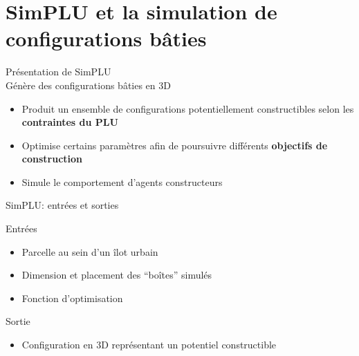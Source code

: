 \documentclass[xcolor=table]{beamer}
\begin{document}
\section[SimPLU]{SimPLU et la simulation de configurations bâties}




\begin{frame}{Présentation de SimPLU}
	\\
	Génère des configurations bâties en 3D
	\begin{itemize}
		\item Produit un ensemble de configurations potentiellement constructibles selon les \textbf{contraintes du PLU}
		\item Optimise certains paramètres afin de poursuivre différents \textbf{objectifs de construction}
		\item Simule le comportement d'agents constructeurs
	\end{itemize} 
\end{frame}

\begin{frame}{SimPLU: entrées et sorties}
	\begin{block}{Entrées}
		\begin{itemize}
			\item Parcelle au sein d'un îlot urbain
			\item Dimension et placement des ``boîtes'' simulés
			\item Fonction d'optimisation
		\end{itemize}
	\end{block}
	\begin{block}{Sortie}
		\begin{itemize}
			\item Configuration en 3D représentant un potentiel constructible
		\end{itemize}
	\end{block}
	\begin{block}
	\end{block}		
\end{frame}
\end{document}
